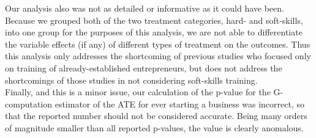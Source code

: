 Our analysis also was not as detailed or informative as it could have been. Because we grouped both of the two treatment categories, hard- and soft-skills, into one group for the purposes of this analysis, we are not able to differentiate the variable effects (if any) of different types of treatment on the outcomes. Thus this analysis only addresses the shortcoming of previous studies who focused only on training of already-established entrepreneurs, but does not address the shortcomings of those studies in not considering soft-skills training.\\

Finally, and this is a minor issue, our calculation of the p-value for the G-computation estimator of the ATE for ever starting a business was incorrect, so that the reported number should not be considered accurate. Being many orders of magnitude smaller than all reported p-values, the value is clearly anomalous.


